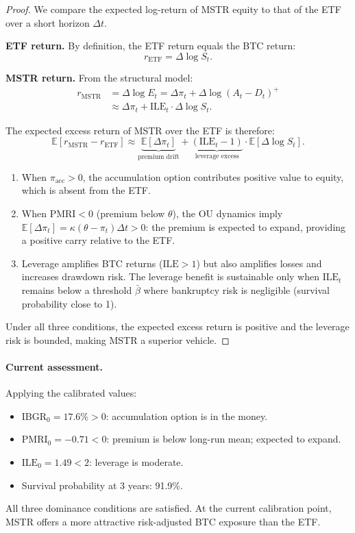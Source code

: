 \begin{proof}
We compare the expected log-return of MSTR equity to that of the ETF over
a short horizon $\Delta t$.

\textbf{ETF return.}  By definition, the ETF return equals the BTC return:
$$
  r_{\mathrm{ETF}} = \Delta\log S_t.
$$

\textbf{MSTR return.}  From the structural model:
\begin{align*}
  r_{\mathrm{MSTR}}
  &= \Delta\log E_t
  = \Delta\pi_t + \Delta\log(A_t - D_t)^+ \\
  &\approx \Delta\pi_t + \mathrm{ILE}_t \cdot \Delta\log S_t.
\end{align*}

The expected excess return of MSTR over the ETF is therefore:
$$
  \mathbb{E}[r_{\mathrm{MSTR}} - r_{\mathrm{ETF}}]
  \approx \underbrace{\mathbb{E}[\Delta\pi_t]}_{\text{premium drift}}
  + \underbrace{(\mathrm{ILE}_t - 1)}_{\text{leverage excess}}
  \cdot \mathbb{E}[\Delta\log S_t].
$$

\begin{enumerate}
  \item When $\pi_{\mathrm{acc}} > 0$, the accumulation option contributes
    positive value to equity, which is absent from the ETF.

  \item When $\mathrm{PMRI} < 0$ (premium below $\theta$), the OU dynamics
    imply $\mathbb{E}[\Delta\pi_t] = \kappa(\theta - \pi_t)\Delta t > 0$:
    the premium is expected to expand, providing a positive carry relative
    to the ETF.

  \item Leverage amplifies BTC returns ($\mathrm{ILE} > 1$) but also
    amplifies losses and increases drawdown risk.  The leverage benefit is
    sustainable only when $\mathrm{ILE}_t$ remains below a threshold
    $\bar\beta$ where bankruptcy risk is negligible (survival probability
    close to 1).
\end{enumerate}

Under all three conditions, the expected excess return is positive and
the leverage risk is bounded, making MSTR a superior vehicle.
\end{proof}

\paragraph{Current assessment.}
Applying the calibrated values:
\begin{itemize}
  \item $\mathrm{IBGR}_0 = 17.6\% > 0$: accumulation option is in the money.
  \item $\mathrm{PMRI}_0 = -0.71 < 0$: premium is below long-run mean;
    expected to expand.
  \item $\mathrm{ILE}_0 = 1.49 < 2$: leverage is moderate.
  \item Survival probability at 3 years: 91.9\%.
\end{itemize}
All three dominance conditions are satisfied.  At the current calibration
point, MSTR offers a more attractive risk-adjusted BTC exposure than the
ETF.

